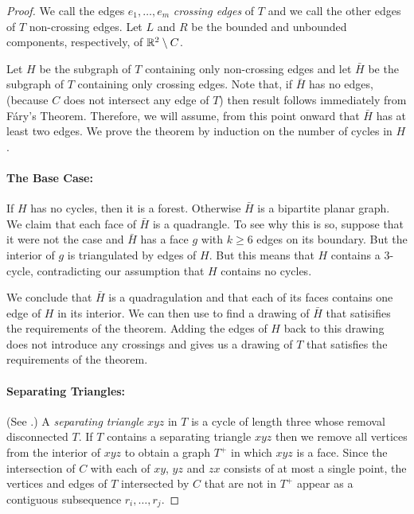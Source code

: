 \documentclass{patmorin}
\begin{document}
\begin{proof}
   We call the edges $e_1,\ldots,e_m$ \emph{crossing edges} of $T$
   and we call the other edges of $T$ non-crossing edges.  Let $L$
   and $R$ be the bounded and unbounded components, respectively, of
   $\mathbb{R}^2\setminus C$.  

   Let $H$ be the subgraph of $T$ containing only non-crossing edges and
   let $\bar{H}$ be the subgraph of $T$ containing only crossing edges.
   Note that, if $\bar{H}$ has no edges, (because $C$ does not intersect
   any edge of $T$) then result follows immediately from F\'ary's Theorem.
   Therefore, we will assume, from this point onward that $\bar{H}$
   has at least two edges.  We prove the theorem by induction on the
   number of cycles in $H$.
   
   \paragraph{The Base Case:}
   If $H$ has no cycles, then it is a forest.  Otherwise $\bar{H}$
   is a bipartite planar graph.  We claim that each face of $\bar{H}$
   is a quadrangle.  To see why this is so, suppose that it were not the
   case and $\bar{H}$ has a face $g$ with $k\ge 6$ edges on its boundary.
   But the interior of $g$ is triangulated by edges of $H$. But this
   means that $H$ contains a 3-cycle, contradicting our assumption that
   $H$ contains no cycles.

   We conclude that $\bar{H}$ is a quadragulation and that each of its
   faces contains one edge of $H$ in its interior.  We can then use
    to find a drawing of $\bar{H}$ that satisifies the
   requirements of the theorem.  Adding the edges of $H$ back to this
   drawing does not introduce any crossings and gives us a drawing of $T$
   that satisfies the requirements of the theorem.

   \paragraph{Separating Triangles:}
   (See .)
   A \emph{separating triangle} $xyz$ in $T$ is a cycle of length three
   whose removal disconnected $T$.  
   If $T$ contains a separating triangle $xyz$ then we remove all vertices
   from the interior of $xyz$ to obtain a graph $T^+$ in which
   $xyz$ is a face.  Since the intersection of $C$ with each of $xy$,
   $yz$ and $zx$ consists of at most a single point, the vertices and
   edges of $T$ intersected by $C$ that are not in $T^+$ appear as a
   contiguous subsequence $r_i,\ldots,r_j$.


\end{proof}
\end{document}
